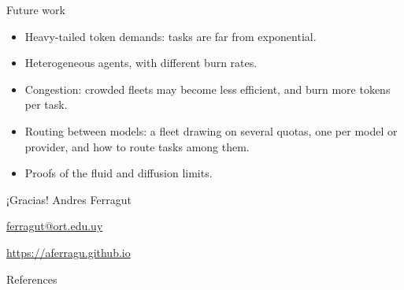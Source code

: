 \documentclass[aspectratio=169]{beamer}
\newenvironment*{myitem}[1][1.5em]{\begin{itemize}\setlength{\itemsep}{#1}}{\end{itemize}}
\begin{document}
\begin{frame}{Future work}

	\begin{myitem}
		\item \alert{Heavy-tailed} token demands: tasks are far from exponential.
		\item \alert{Heterogeneous} agents, with different burn rates.
		\item \alert{Congestion}: crowded fleets may become less efficient, and burn more tokens per task.
		\item \alert{Routing} between models: a fleet drawing on several quotas, one per model or provider, and how to route tasks among them.
		\item Proofs of the \alert{fluid} and \alert{diffusion} limits.
	\end{myitem}
\end{frame}

\begin{frame}[plain]
	\vfill
	{\Huge \alert{¡Gracias!}}
	\vfill
	Andres Ferragut

	\smallskip

	\href{mailto://ferragut@ort.edu.uy}{\alert{ferragut@ort.edu.uy}}

	\smallskip

	\href{http://aferragu.github.io}{\alert{https://aferragu.github.io}}
\end{frame}

\begin{frame}[allowframebreaks]{References}
	
\end{frame}
\end{document}
